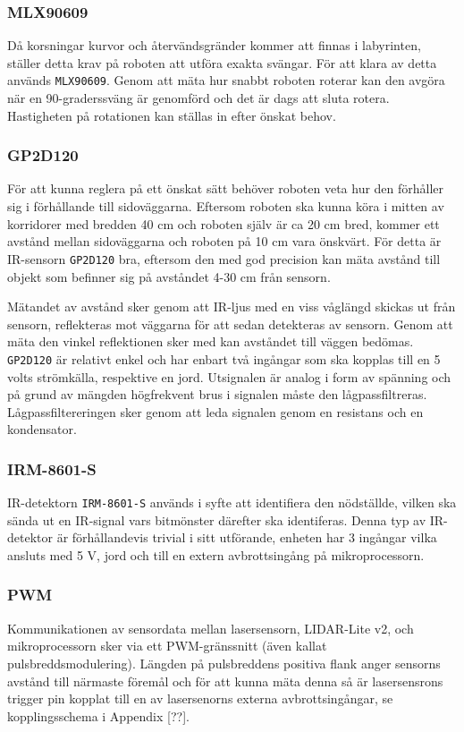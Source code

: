 \documentclass[11pt]{article}
\begin{document}
\begin{flushleft}
\subsubsection{MLX90609}
Då korsningar kurvor och återvändsgränder kommer att finnas i labyrinten, ställer detta krav på roboten att utföra exakta svängar. För att klara av detta används \verb+MLX90609+. Genom att mäta hur snabbt roboten roterar kan den avgöra när en 90-graderssväng är genomförd och det är dags att sluta rotera. Hastigheten på rotationen kan ställas in efter önskat behov.

\subsubsection{GP2D120}
För att kunna reglera på ett önskat sätt behöver roboten veta hur den förhåller sig i förhållande till sidoväggarna. Eftersom roboten ska kunna köra i mitten av korridorer med bredden 40 cm och roboten själv är ca 20 cm bred, kommer ett avstånd mellan sidoväggarna och roboten på 10 cm vara önskvärt. För detta är IR-sensorn \verb+GP2D120+ bra, eftersom den med god precision kan mäta avstånd till objekt som befinner sig på avståndet 4-30 cm från sensorn. 

Mätandet av avstånd sker genom att IR-ljus med en viss våglängd skickas ut från sensorn, reflekteras mot väggarna för att sedan detekteras av sensorn. Genom att mäta den vinkel reflektionen sker med kan avståndet till väggen bedömas. \verb+GP2D120+ är relativt enkel och har enbart två ingångar som ska kopplas till en 5 volts strömkälla, respektive en jord.  Utsignalen är analog i form av spänning och på grund av mängden högfrekvent brus i signalen måste den lågpassfiltreras. Lågpassfiltereringen sker genom att leda signalen genom en resistans och en kondensator.

\subsubsection{IRM-8601-S}
IR-detektorn \verb+IRM-8601-S+ används i syfte att identifiera den nödställde, vilken ska sända ut en IR-signal vars bitmönster därefter ska identiferas. Denna typ av IR-detektor är förhållandevis trivial i sitt utförande, enheten har 3 ingångar vilka ansluts med 5 V, jord och till en extern avbrottsingång på mikroprocessorn. 

\subsubsection{PWM}
Kommunikationen av sensordata mellan lasersensorn, LIDAR-Lite v2, och mikroprocessorn sker via ett PWM-gränssnitt (även kallat pulsbreddsmodulering). Längden på pulsbreddens positiva flank anger sensorns avstånd till närmaste föremål och för att kunna mäta denna så är lasersensrons trigger pin kopplat till en av lasersenorns externa avbrottsingångar, se kopplingsschema i Appendix [??]. 


\end{flushleft}
\end{document}
